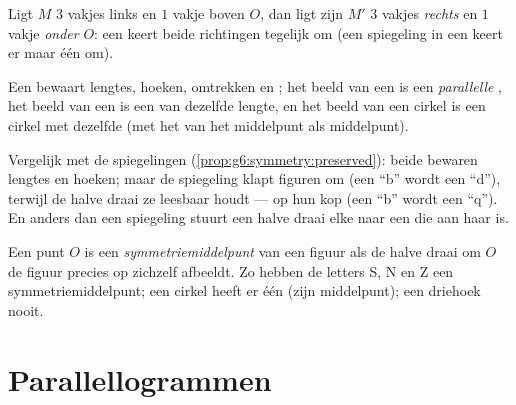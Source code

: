 \begin{example}\label{ex:g7:central:grid}
Ligt $M$ $3$ vakjes links en $1$ vakje boven $O$, dan ligt zijn  $M'$
$3$ vakjes \emph{rechts} en $1$ vakje \emph{onder} $O$: een  keert
beide richtingen tegelijk om (een spiegeling in een  keert er maar één om).
\end{example}

\begin{proposition}\label{prop:g7:central:preserved}
Een  bewaart lengtes, hoeken, omtrekken en ; het beeld van
een  is een \emph{parallelle} , het beeld van een  is een 
 van dezelfde lengte, en het beeld van een cirkel is een cirkel met dezelfde
 (met het  van het middelpunt als middelpunt).
\end{proposition}
\admitted

\begin{remark}
Vergelijk met de spiegelingen (\cref{prop:g6:symmetry:preserved}): beide bewaren
lengtes en hoeken; maar de spiegeling klapt figuren om (een ``b'' wordt een ``d''),
terwijl de halve draai ze leesbaar houdt --- op hun kop (een ``b'' wordt een ``q'').
En anders dan een spiegeling stuurt een halve draai elke  naar een  die
 aan haar is.
\end{remark}

\begin{definition}[Symmetriemiddelpunt]\label{def:g7:central:center}
Een punt $O$ is een \emph{symmetriemiddelpunt} van een
figuur als de halve draai om $O$ de figuur precies op zichzelf afbeeldt. Zo hebben
de letters S, N en Z een symmetriemiddelpunt; een cirkel heeft er één (zijn
middelpunt); een driehoek nooit.
\end{definition}

\section{Parallellogrammen}

